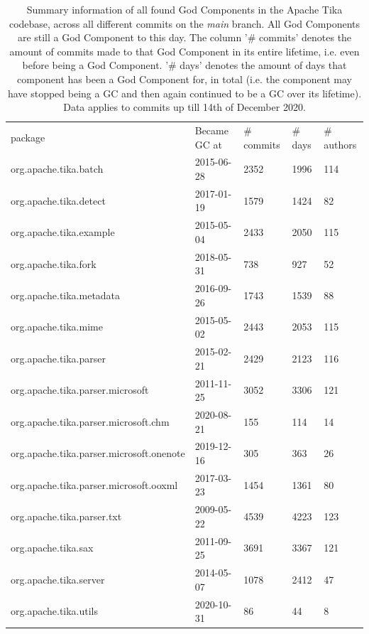 \documentclass{article}
\begin{document}
\begin{table}[ht]
\begin{tabular}{lllll}
package                                  & Became GC at & \# commits & \# days & \# authors \\
org.apache.tika.batch                    & 2015-06-28   & 2352          & 1996       & 114        \\
org.apache.tika.detect                   & 2017-01-19   & 1579          & 1424       & 82         \\
org.apache.tika.example                  & 2015-05-04   & 2433          & 2050       & 115        \\
org.apache.tika.fork                     & 2018-05-31   & 738           & 927        & 52         \\
org.apache.tika.metadata                 & 2016-09-26   & 1743          & 1539       & 88         \\
org.apache.tika.mime                     & 2015-05-02   & 2443          & 2053       & 115        \\
org.apache.tika.parser                   & 2015-02-21   & 2429          & 2123       & 116        \\
org.apache.tika.parser.microsoft         & 2011-11-25   & 3052          & 3306       & 121        \\
org.apache.tika.parser.microsoft.chm     & 2020-08-21   & 155           & 114        & 14         \\
org.apache.tika.parser.microsoft.onenote & 2019-12-16   & 305           & 363        & 26         \\
org.apache.tika.parser.microsoft.ooxml   & 2017-03-23   & 1454          & 1361       & 80         \\
org.apache.tika.parser.txt               & 2009-05-22   & 4539          & 4223       & 123        \\
org.apache.tika.sax                      & 2011-09-25   & 3691          & 3367       & 121        \\
org.apache.tika.server                   & 2014-05-07   & 1078          & 2412       & 47         \\
org.apache.tika.utils                    & 2020-10-31   & 86            & 44         & 8         
\end{tabular}
\caption{Summary information of all found God Components in the Apache Tika codebase, across all different commits on the \textit{main} branch. All God Components are still a God Component to this day. The column '\# commits' denotes the amount of commits made to that God Component in its entire lifetime, i.e. even before being a God Component. '\# days' denotes the amount of days that component has been a God Component for, in total (i.e. the component may have stopped being a GC and then again continued to be a GC over its lifetime). Data applies to commits up till 14th of December 2020.}
\label{tab:gc-summary}
\end{table}
\end{document}
